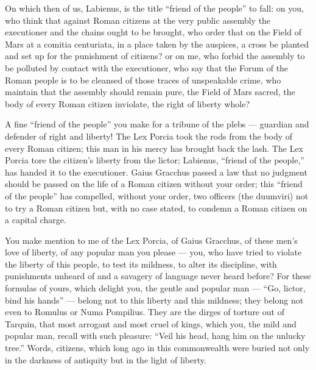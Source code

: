  On which then of us, Labienus, is the title ``friend of the people'' to fall: on you, who think that against Roman citizens at the very public assembly the executioner and the chains ought to be brought, who order that on the Field of Mars at a comitia centuriata, in a place taken by the auspices, a cross be planted and set up for the punishment of citizens? or on me, who forbid the assembly to be polluted by contact with the executioner, who say that the Forum of the Roman people is to be cleansed of those traces of unspeakable crime, who maintain that the assembly should remain pure, the Field of Mars sacred, the body of every Roman citizen inviolate, the right of liberty whole?

 A fine ``friend of the people'' you make for a tribune of the plebs --- guardian and defender of right and liberty! The Lex Porcia took the rods from the body of every Roman citizen; this man in his mercy has brought back the lash. The Lex Porcia tore the citizen's liberty from the lictor; Labienus, ``friend of the people,'' has handed it to the executioner. Gaius Gracchus passed a law that no judgment should be passed on the life of a Roman citizen without your order; this ``friend of the people'' has compelled, without your order, two officers (the duumviri) not to try a Roman citizen but, with no case stated, to condemn a Roman citizen on a capital charge.

 You make mention to me of the Lex Porcia, of Gaius Gracchus, of these men's love of liberty, of any popular man you please --- you, who have tried to violate the liberty of this people, to test its mildness, to alter its discipline, with punishments unheard of and a savagery of language never heard before? For these formulas of yours, which delight you, the gentle and popular man --- ``Go, lictor, bind his hands'' --- belong not to this liberty and this mildness; they belong not even to Romulus or Numa Pompilius. They are the dirges of torture out of Tarquin, that most arrogant and most cruel of kings, which you, the mild and popular man, recall with such pleasure: ``Veil his head, hang him on the unlucky tree.'' Words, citizens, which long ago in this commonwealth were buried not only in the darkness of antiquity but in the light of liberty.

